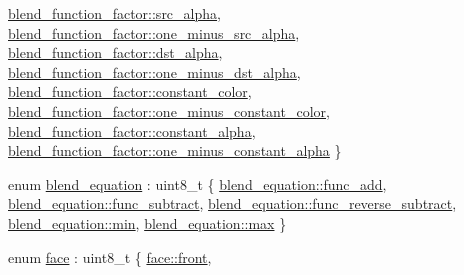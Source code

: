 \begin{DoxyCompactItemize}
\mbox{\hyperlink{namespacemoka_a631c77633ed9ed0c34a6632a8211a19daff175e9d424fcb3eef837a773872fb9e}{blend\+\_\+function\+\_\+factor\+::src\+\_\+alpha}}, 
\mbox{\hyperlink{namespacemoka_a631c77633ed9ed0c34a6632a8211a19daa415ef353601f5e5d8a3e5ac06683703}{blend\+\_\+function\+\_\+factor\+::one\+\_\+minus\+\_\+src\+\_\+alpha}}, 
\newline
\mbox{\hyperlink{namespacemoka_a631c77633ed9ed0c34a6632a8211a19dab71b79d6bf971b9dd2ee1d43565ab344}{blend\+\_\+function\+\_\+factor\+::dst\+\_\+alpha}}, 
\mbox{\hyperlink{namespacemoka_a631c77633ed9ed0c34a6632a8211a19da8d3a4c2d0c55b1041c69d3fdd7ed55e1}{blend\+\_\+function\+\_\+factor\+::one\+\_\+minus\+\_\+dst\+\_\+alpha}}, 
\mbox{\hyperlink{namespacemoka_a631c77633ed9ed0c34a6632a8211a19daec5574dc954581793a5dcbdf0e358ae1}{blend\+\_\+function\+\_\+factor\+::constant\+\_\+color}}, 
\mbox{\hyperlink{namespacemoka_a631c77633ed9ed0c34a6632a8211a19da645421b2fe9a762542bf70220d9eae9c}{blend\+\_\+function\+\_\+factor\+::one\+\_\+minus\+\_\+constant\+\_\+color}}, 
\newline
\mbox{\hyperlink{namespacemoka_a631c77633ed9ed0c34a6632a8211a19da9831f8a00f48f451286ea6c16cd2f55e}{blend\+\_\+function\+\_\+factor\+::constant\+\_\+alpha}}, 
\mbox{\hyperlink{namespacemoka_a631c77633ed9ed0c34a6632a8211a19dae984532432604da975ecbe092f88091c}{blend\+\_\+function\+\_\+factor\+::one\+\_\+minus\+\_\+constant\+\_\+alpha}}
 \}
\item 
enum \mbox{\hyperlink{namespacemoka_acf03408f89c521244763fb5f8746ce16}{blend\+\_\+equation}} \+: uint8\+\_\+t \{ \newline
\mbox{\hyperlink{namespacemoka_acf03408f89c521244763fb5f8746ce16ae356d88a1e5f1a9a32dcc057d706021a}{blend\+\_\+equation\+::func\+\_\+add}}, 
\mbox{\hyperlink{namespacemoka_acf03408f89c521244763fb5f8746ce16a160e52a657d33bcf01fe074c7451e7e5}{blend\+\_\+equation\+::func\+\_\+subtract}}, 
\mbox{\hyperlink{namespacemoka_acf03408f89c521244763fb5f8746ce16a18cd6caa57b49c00aa5f4c327ede38f2}{blend\+\_\+equation\+::func\+\_\+reverse\+\_\+subtract}}, 
\mbox{\hyperlink{namespacemoka_acf03408f89c521244763fb5f8746ce16ad8bd79cc131920d5de426f914d17405a}{blend\+\_\+equation\+::min}}, 
\newline
\mbox{\hyperlink{namespacemoka_acf03408f89c521244763fb5f8746ce16a2ffe4e77325d9a7152f7086ea7aa5114}{blend\+\_\+equation\+::max}}
 \}
\item 
enum \mbox{\hyperlink{namespacemoka_a262acd665924ba4041f64f7207b17cbe}{face}} \+: uint8\+\_\+t \{ \mbox{\hyperlink{namespacemoka_a262acd665924ba4041f64f7207b17cbeae6ec529ba185279aa0adcf93e645c7cd}{face\+::front}}, 

\end{DoxyCompactItemize}
